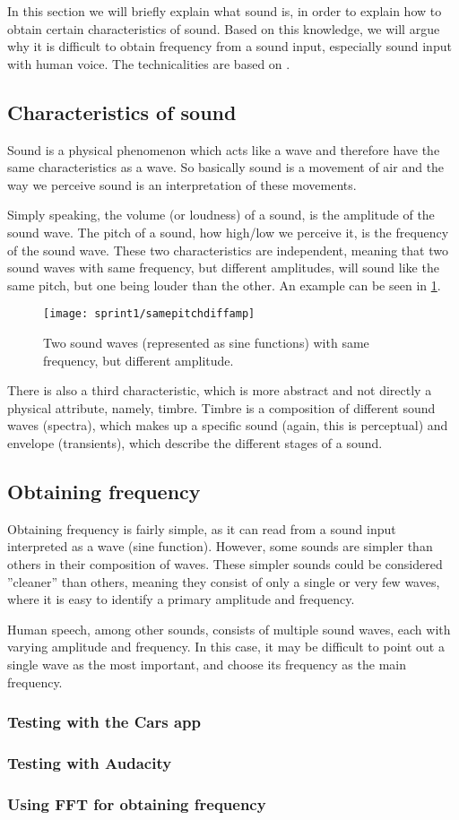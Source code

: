In this section we will briefly explain what sound is, in order to explain how to obtain certain characteristics of sound.
Based on this knowledge, we will argue why it is difficult to obtain frequency from a sound input, especially sound input with human voice.
The technicalities are based on \cite{music-and-computers}.

\subsection{Characteristics of sound}
Sound is a physical phenomenon which acts like a wave and therefore have the same characteristics as a wave.
So basically sound is a movement of air and the way we perceive sound is an interpretation of these movements.

Simply speaking, the volume (or loudness) of a sound, is the amplitude of the sound wave.
The pitch of a sound, how high/low we perceive it, is the frequency of the sound wave.
These two characteristics are independent, meaning that two sound waves with same frequency, but different amplitudes, will sound like the same pitch, but one being louder than the other.
An example can be seen in \cref{fig:samepitchdiffamp}.

\begin{figure}[h]
\texttt{[image: sprint1/samepitchdiffamp]}
\caption{Two sound waves (represented as sine functions) with same frequency, but different amplitude.}
\label{fig:samepitchdiffamp}
\end{figure}

There is also a third characteristic, which is more abstract and not directly a physical attribute, namely, timbre.
Timbre is a composition of different sound waves (spectra), which makes up a specific sound (again, this is perceptual) and envelope (transients), which describe the different stages of a sound.

\subsection{Obtaining frequency}
Obtaining frequency is fairly simple, as it can read from a sound input interpreted as a wave (sine function).
However, some sounds are simpler than others in their composition of waves.
These simpler sounds could be considered ''cleaner'' than others, meaning they consist of only a single or very few waves, where it is easy to identify a primary amplitude and frequency.

Human speech, among other sounds, consists of multiple sound waves, each with varying amplitude and frequency.
In this case, it may be difficult to point out a single wave as the most important, and choose its frequency as the main frequency.

\subsubsection{Testing with the Cars app}

\subsubsection{Testing with Audacity}

\subsubsection{Using FFT for obtaining frequency}
